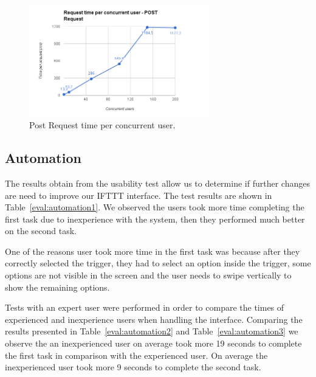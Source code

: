 \begin{figure}[H]
\centering
\includegraphics[width=0.7\textwidth]{Figures/bench_post}
\caption{Post Request time per concurrent user.}
\label{eval:server2}
\end{figure}





\subsection{Automation}

The results obtain from the usability test allow us to determine if further changes are need to improve our \ac{IFTTT} interface. The test results are shown in  Table~\ref{eval:automation1}. We observed the users took more time completing the first task due to inexperience with the system, then they performed much better on the second task. 

One of the reasons user took more time in the first task was because after they correctly selected the trigger, they had to select an option inside the trigger, some options are not visible in the screen and the user needs to swipe vertically to show the remaining options.

Tests with an expert user were performed in order to compare the times of experienced and inexperience users when handling the interface. Comparing the results presented in Table~\ref{eval:automation2} and Table~\ref{eval:automation3} we observe the an inexperienced user on average took more 19 seconds to complete the first task in comparison with the experienced user. On average the inexperienced user took more 9 seconds to complete the second task.


